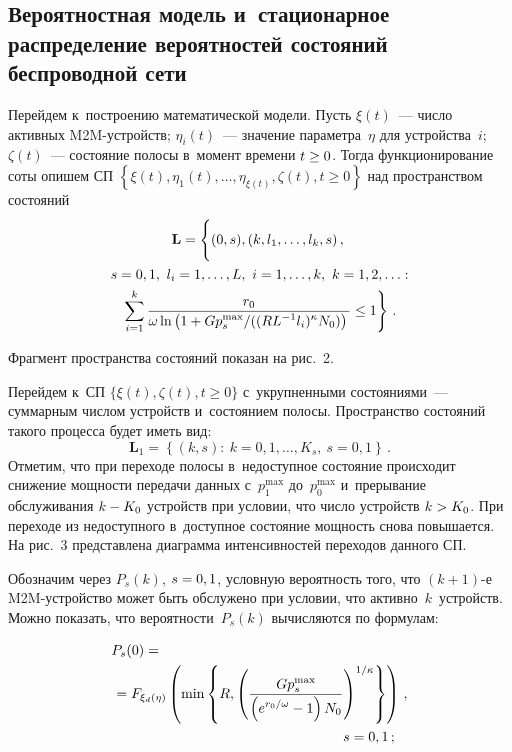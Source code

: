   \begin{multicols}{2}
  

  
\section{Вероятностная модель и~стационарное распределение 
вероятностей состояний беспроводной сети}

  Перейдем к~построению математической модели. Пусть $\xi(t)$~--- число 
активных M2M-устройств; $\eta_i(t)$~--- значение параметра~$\eta$ для 
устройства~$i$; $\zeta(t)$~--- состояние полосы в~момент времени $t\hm\geq 0$. 
Тогда функционирование соты опишем СП $\left\{ \xi(t),\eta_1(t),\ldots 
,\eta_{\xi(t)},\zeta(t), t\geq0\right\}$ над пространством состояний
  \begin{multline*}
  \mathbf{L}\hm= 
  \left\{ 
    \vphantom{\sum\limits_{i=1}^k}
    (0,s), \left(k,l_1,\ldots ,l_k, s\right), \right.\\ 
  s=0,1,\ l_i=1,\ldots 
,L,\ i=1,\ldots , k,\ k=1,2,\ldots: \\
\left.  \sum\limits_{i=1}^k \fr{r_0}{\omega \ln \left( 1+Gp_s^{\max}/((RL^{-
1}l_i)^\kappa N_0)\right)}\leq 1\right\}\,.
  \end{multline*}

Фрагмент пространства состояний показан на рис.~2.
    

  Перейдем к~СП $\{\xi(t),\zeta(t), t\geq0\}$ с~укрупненными состояниями~--- 
суммарным числом устройств и~состоянием полосы. Пространство состояний 
такого процесса будет иметь вид:
  \begin{equation*}
  \mathbf{L}_1 =\left\{ (k,s):\ k=0,1,\ldots ,K_s,\ s=0,1\right\}\,.
  \end{equation*}
Отметим, что при переходе полосы в~недоступное состояние происходит 
снижение мощности передачи данных с~$p_1^{\max}$ до~$p_0^{\max}$ 
и~прерывание обслуживания $k\hm-K_0$ устройств при условии, что число 
устройств $k\hm>K_0$. При переходе из недоступного в~доступное состояние 
мощность снова повышается. На рис.~3 представлена диаграмма 
интенсивностей переходов данного СП.
    
    

  Обозначим через $P_s(k)$, $s\hm=0,1$, условную ве\-ро\-ят\-ность того, что 
$(k+1)$-е M2M-устройство может быть обслужено при условии, что 
активно~$k$~устройств. Можно показать, что ве\-ро\-ят\-но\-сти~$P_s(k)$ 
вы\-чис\-ля\-ют\-ся по формулам:

\noindent
  \begin{align*}
  P_s(0) &={}\\
  &\hspace*{-8mm}{}=F_{\xi_d(\eta)} \left( \min 
  \left\{ R, \left( \fr{Gp_s^{\max}}{\left( 
e^{r_0/\omega} -1\right) N_0}\right)^{1/\kappa}\right\}\right)\,,\\
&\hspace*{50mm}s=0,1\,;
\end{align*}

\end{multicols}

